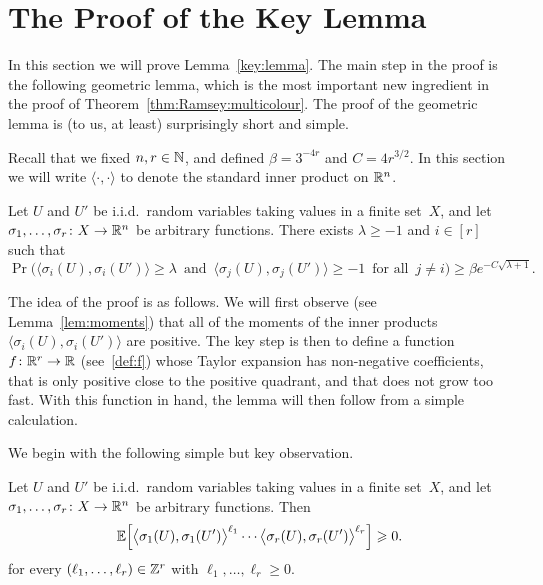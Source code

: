 \section{The Proof of the Key Lemma}\label{sec:key:lemma}

In this section we will prove Lemma~\ref{key:lemma}. The main step in the proof is the following geometric lemma, which is the most important new ingredient in the proof of Theorem~\ref{thm:Ramsey:multicolour}. The proof of the geometric lemma is (to us, at least) surprisingly short and simple. 

Recall that we fixed $n,r \in \mathbb{N}$, and defined $\beta = 3^{-4r}$ and $C = 4r^{3/2}$. In this section we will write $\langle\cdot,\cdot\rangle$ to denote the standard inner product on $\mathbb{R}^n$.  

\begin{lemma}\label{lem:lambda}
Let\/ $U$ and\/ $U'$ be i.i.d.~random variables taking values in a finite set~$X$, and let $\sigma_1,\ldots,\sigma_r \colon X \rightarrow \mathbb{R}^n$ be arbitrary functions. There exists $\lambda\ge-1$ and\/ $i\in[r]$ such that
$$\Pr\Big( \big\langle \sigma_i(U),\sigma_i(U') \big\rangle \ge \lambda \, \text{ and } \, \big\langle \sigma_j(U), \sigma_j(U') \big\rangle \ge -1 \, \text{ for all } \, j \ne i \Big) \ge \beta e^{- C\sqrt{\lambda + 1}}.$$
\end{lemma}

The idea of the proof is as follows. We will first observe (see Lemma~\ref{lem:moments}) that all of the moments of the inner products $\langle \sigma_i(U),\sigma_i(U') \rangle$ are positive. The key step is then to define a function $f \colon \mathbb{R}^r \rightarrow \mathbb{R}$ (see~\eqref{def:f}) whose Taylor expansion has non-negative coefficients, that is only positive close to the positive quadrant, and that does not grow too fast. With this function in hand, the lemma will then follow from a simple calculation. 

We begin with the following simple but key observation. 

\begin{lemma}\label{lem:moments}
Let $U$ and\/ $U'$ be i.i.d.~random variables taking values in a finite set~$X$, and let\/ $\sigma_1,\ldots,\sigma_r \colon X \rightarrow \mathbb{R}^n$ be arbitrary functions. Then
$$\mathbb{E}\Big[ \big\langle \sigma_1(U),\sigma_1(U') \big\rangle^{\ell_1} \cdots \big\langle \sigma_r(U),\sigma_r(U') \big\rangle^{\ell_r} \Big] \geqslant 0.$$
for every $(\ell_1,\dots,\ell_r) \in \mathbb{Z}^r$ with $\ell_1,\dots,\ell_r \ge 0$.
\end{lemma}

